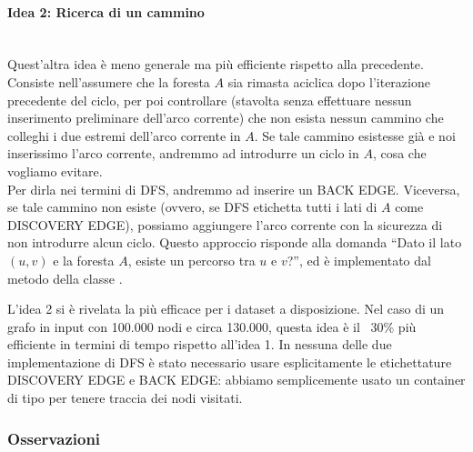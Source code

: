 \paragraph{Idea 2: Ricerca di un cammino}\mbox{} \\

\noindent Quest'altra idea è meno generale ma più efficiente rispetto alla precedente. Consiste nell'assumere che la foresta $A$ sia rimasta aciclica dopo l'iterazione precedente del ciclo, per poi controllare (stavolta senza effettuare nessun inserimento preliminare dell'arco corrente) che non esista nessun cammino che colleghi i due estremi dell'arco corrente in $A$.
Se tale cammino esistesse già e noi inserissimo l'arco corrente, andremmo ad introdurre un ciclo in $A$, cosa che vogliamo evitare.\\
Per dirla nei termini di DFS, andremmo ad inserire un BACK EDGE. Viceversa, se tale cammino non esiste (ovvero, se DFS etichetta tutti i lati di $A$ come DISCOVERY EDGE), possiamo aggiungere l'arco corrente con la sicurezza di non introdurre alcun ciclo.
Questo approccio risponde alla domanda ``Dato il lato $(u, v)$ e la foresta $A$, esiste un percorso tra $u$ e $v$?'', ed è implementato dal metodo  della classe . \\

\vspace{0.5cm}

\noindent L'idea 2 si è rivelata la più efficace per i dataset a disposizione. Nel caso di un grafo in input con 100.000 nodi e circa 130.000, questa idea è il ~30\% più efficiente in termini di tempo rispetto all'idea 1. In nessuna delle due implementazione di DFS è stato necessario usare esplicitamente le etichettature DISCOVERY EDGE e BACK EDGE: abbiamo semplicemente usato un container di tipo  per tenere traccia dei nodi visitati.

\subsubsection{Osservazioni}

